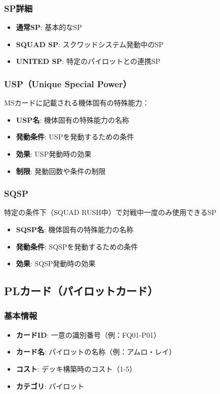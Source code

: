 \subsubsection*{SP詳細}
\begin{itemize}
    \item \textbf{通常SP}: 基本的なSP
    \item \textbf{SQUAD SP}: スクワッドシステム発動中のSP
    \item \textbf{UNITED SP}: 特定のパイロットとの連携SP
\end{itemize}

\subsubsection*{USP（Unique Special Power）}
MSカードに記載される機体固有の特殊能力：
\begin{itemize}
    \item \textbf{USP名}: 機体固有の特殊能力の名称
    \item \textbf{発動条件}: USPを発動するための条件
    \item \textbf{効果}: USP発動時の効果
    \item \textbf{制限}: 発動回数や条件の制限
\end{itemize}

\subsubsection*{SQSP}
特定の条件下（SQUAD RUSH中）で対戦中一度のみ使用できるSP
\begin{itemize}
    \item \textbf{SQSP名}: 機体固有の特殊能力の名称
    \item \textbf{発動条件}: SQSPを発動するための条件
    \item \textbf{効果}: SQSP発動時の効果
\end{itemize}


\subsection*{PLカード（パイロットカード）}

\subsubsection*{基本情報}
\begin{itemize}
    \item \textbf{カードID}: 一意の識別番号（例：FQ01-P01）
    \item \textbf{カード名}: パイロットの名称（例：アムロ・レイ）
    \item \textbf{コスト}: デッキ構築時のコスト（1-5）
    \item \textbf{カテゴリ}: パイロット
\end{itemize}

